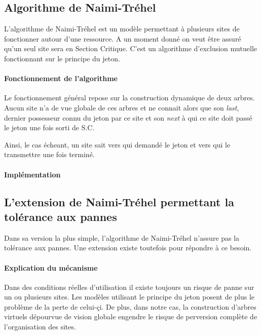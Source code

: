 \documentclass[a4paper,12pt]{article}
\newcommand{\nt}{Naimi-Tréhel }
\begin{document}
\subsection{Algorithme de \nt}

L'algorithme de \nt est un modèle permettant à plusieurs sites de fonctionner autour d'une ressource. A un moment donné on veut être assuré qu'un seul site sera en Section Critique. C'est un algorithme d'exclusion mutuelle fonctionnant sur le principe du jeton.

\paragraph{Fonctionnement de l'algorithme}

Le fonctionnement général repose sur la construction dynamique de deux arbres. Aucun site n'a de vue globale de ces arbres et ne connait alors que son \textit{last}, dernier possesseur connu du jeton par ce site et son \textit{next} à qui ce site doit passé le jeton une fois sorti de S.C.

Ainsi, le cas écheant, un site sait vers qui demandé le jeton et vers qui le transmettre une fois terminé.

\paragraph{Implémentation}


\subsection{L'extension de \nt permettant la tolérance aux pannes}

Dans sa version la plus simple, l'algorithme de \nt n'assure pas la tolérance aux pannes. Une extension existe toutefois pour répondre à ce besoin.

\paragraph{Explication du mécanisme}

Dans des conditions réelles d'utilisation il existe toujours un risque de panne sur un ou plusieurs sites. Les modèles utilisant le principe du jeton posent de plus le problème de la perte de celui-çi. De plus, dans notre cas, la construction d'arbres virtuels dépourvue de vision globale engendre le risque de perversion complète de l'organisation des sites.
\end{document}
